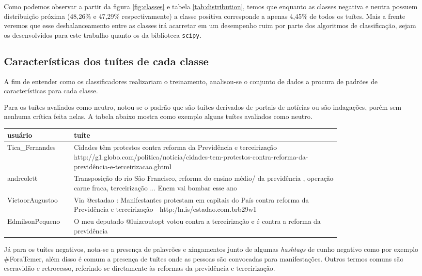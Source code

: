 Como podemos observar a partir da figura \ref{fig:classes} e tabela \ref{tab:distribution}, temos
que enquanto as classes negativa e neutra possuem distribuição próxima (48,26\% e 47,29\% 
respectivamente) a classe positiva corresponde a apenas 4,45\% de todos os tuítes. Mais a frente
veremos que esse desbalanceamento entre as classes irá acarretar em um desempenho ruim por parte
dos algoritmos de classificação, sejam os desenvolvidos para este trabalho quanto os da biblioteca
\texttt{scipy}.

\subsection{Características dos tuítes de cada classe}

A fim de entender como os classificadores realizariam o treinamento, analisou-se o conjunto de
dados a procura de padrões de características para cada classe.

Para os tuítes avaliados como neutro, notou-se o padrão que são tuítes derivados de portais de 
notícias ou são indagações, porém sem nenhuma crítica feita nelas.
A tabela abaixo mostra como exemplo alguns tuítes avaliados como neutro.

\begin{center}
	\begin{tabular}{| l | p{0.8\linewidth} |}
		\hline
		usuário & tuíte \\
		\hline
		Tica_Fernandes & Cidades têm protestos contra reforma da Previdência e terceirização http://g1.globo.com/politica/noticia/cidades-tem-protestos-contra-reforma-da-previdência-e-terceirizacao.ghtml \\
		\hline
		andrcolett & Transposição do rio São Francisco, reforma do ensino médio/ da previdência , operação carne fraca, terceirização ... Enem vai bombar esse ano \\
		\hline
		VictoorAugustoo & Via @estadao : Manifestantes protestam em capitais do País contra reforma da Previdência e terceirização - http:/ln.is/estadao.com.brb29w1 \\
		\hline
		EdmilsonPequeno & O meu deputado @luizcoutopt votou contra a terceirização e é contra a reforma da previdência \\
		\hline
	\end{tabular}
\end{center}

Já para os tuítes negativos, nota-se a presença de palavrões e xingamentos 
junto de algumas \textit{hashtags} de cunho negativo como por exemplo \#ForaTemer,
além disso é comum a presença de tuítes onde as pessoas são convocadas para manifestações.
Outros termos comuns são escravidão e retrocesso, referindo-se diretamente às reformas da previdência e terceirização.

